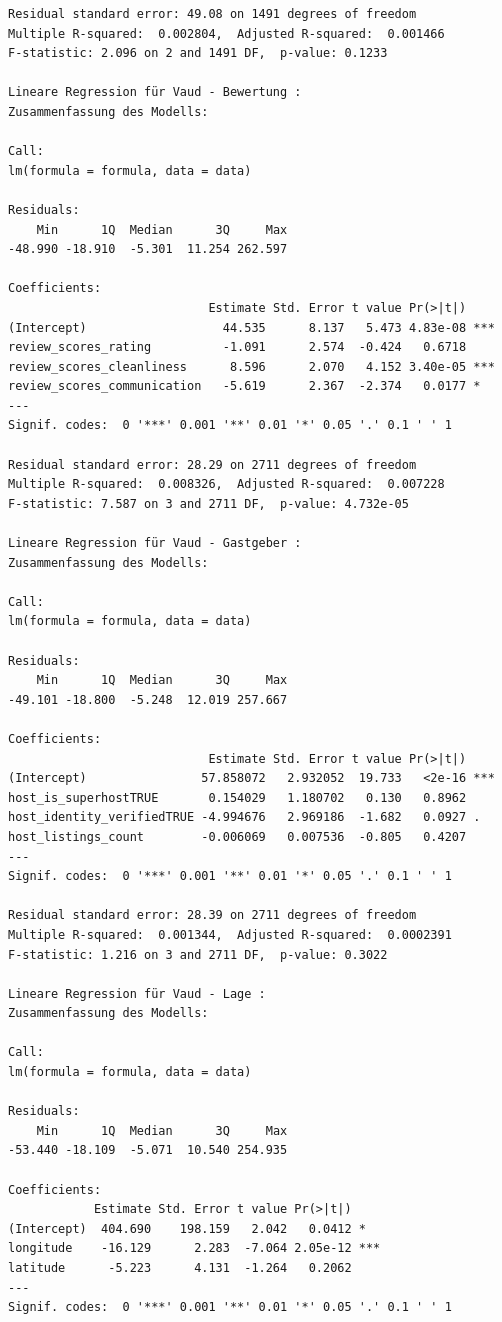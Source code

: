 \documentclass[
  journal,
]{IEEEtran}%
\begin{document}
\begin{verbatim}
Residual standard error: 49.08 on 1491 degrees of freedom
Multiple R-squared:  0.002804,  Adjusted R-squared:  0.001466 
F-statistic: 2.096 on 2 and 1491 DF,  p-value: 0.1233

Lineare Regression für Vaud - Bewertung :
Zusammenfassung des Modells:

Call:
lm(formula = formula, data = data)

Residuals:
    Min      1Q  Median      3Q     Max 
-48.990 -18.910  -5.301  11.254 262.597 

Coefficients:
                            Estimate Std. Error t value Pr(>|t|)    
(Intercept)                   44.535      8.137   5.473 4.83e-08 ***
review_scores_rating          -1.091      2.574  -0.424   0.6718    
review_scores_cleanliness      8.596      2.070   4.152 3.40e-05 ***
review_scores_communication   -5.619      2.367  -2.374   0.0177 *  
---
Signif. codes:  0 '***' 0.001 '**' 0.01 '*' 0.05 '.' 0.1 ' ' 1

Residual standard error: 28.29 on 2711 degrees of freedom
Multiple R-squared:  0.008326,  Adjusted R-squared:  0.007228 
F-statistic: 7.587 on 3 and 2711 DF,  p-value: 4.732e-05

Lineare Regression für Vaud - Gastgeber :
Zusammenfassung des Modells:

Call:
lm(formula = formula, data = data)

Residuals:
    Min      1Q  Median      3Q     Max 
-49.101 -18.800  -5.248  12.019 257.667 

Coefficients:
                            Estimate Std. Error t value Pr(>|t|)    
(Intercept)                57.858072   2.932052  19.733   <2e-16 ***
host_is_superhostTRUE       0.154029   1.180702   0.130   0.8962    
host_identity_verifiedTRUE -4.994676   2.969186  -1.682   0.0927 .  
host_listings_count        -0.006069   0.007536  -0.805   0.4207    
---
Signif. codes:  0 '***' 0.001 '**' 0.01 '*' 0.05 '.' 0.1 ' ' 1

Residual standard error: 28.39 on 2711 degrees of freedom
Multiple R-squared:  0.001344,  Adjusted R-squared:  0.0002391 
F-statistic: 1.216 on 3 and 2711 DF,  p-value: 0.3022

Lineare Regression für Vaud - Lage :
Zusammenfassung des Modells:

Call:
lm(formula = formula, data = data)

Residuals:
    Min      1Q  Median      3Q     Max 
-53.440 -18.109  -5.071  10.540 254.935 

Coefficients:
            Estimate Std. Error t value Pr(>|t|)    
(Intercept)  404.690    198.159   2.042   0.0412 *  
longitude    -16.129      2.283  -7.064 2.05e-12 ***
latitude      -5.223      4.131  -1.264   0.2062    
---
Signif. codes:  0 '***' 0.001 '**' 0.01 '*' 0.05 '.' 0.1 ' ' 1


\end{verbatim}
\end{document}
